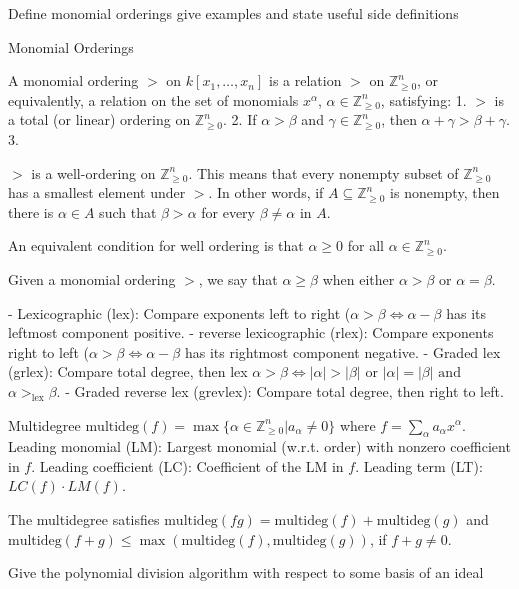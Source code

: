 
Define monomial orderings give examples and state useful side definitions 

Monomial Orderings

A monomial ordering \(>\) on \(k[x_1, \ldots, x_n]\) is a relation \(>\) on \(\mathbb{Z}_{\geq 0}^n\), or equivalently, 
a relation on the set of monomials \(x^{\alpha}\), \(\alpha \in \mathbb{Z}_{\geq 0}^n\), satisfying:
1. \(>\) is a total (or linear) ordering on \(\mathbb{Z}_{\geq 0}^n\).
2. If \(\alpha > \beta\) and \(\gamma \in \mathbb{Z}_{\geq 0}^n\), then \(\alpha + \gamma > \beta + \gamma\).
3.  \item \(>\) is a well-ordering on \(\mathbb{Z}_{\geq 0}^n\). This means that every nonempty subset of \(\mathbb{Z}_{\geq 0}^n\) has a smallest element under \(>\). In other words, if \(A \subseteq \mathbb{Z}_{\geq 0}^n\) is nonempty, then there is \(\alpha \in A\) such that \(\beta > \alpha\) for every \(\beta \ne \alpha\) in \(A\).

An equivalent condition for well ordering is that \( \alpha \geq 0 \) for all \( \alpha \in \mathbb{Z}^n_{\geq 0} \).

Given a monomial ordering \(>\), we say that \(\alpha \geq \beta\) when either \(\alpha > \beta\) or \(\alpha = \beta\).

- Lexicographic (lex): Compare exponents left to right (\( \alpha > \beta \iff \alpha - \beta \) has its leftmost component positive.
- reverse lexicographic (rlex): Compare exponents right to left (\( \alpha > \beta \iff \alpha - \beta \) has its rightmost component negative.
- Graded lex (grlex): Compare total degree, then lex \( \alpha > \beta \iff |\alpha| > |\beta| \text{ or } |\alpha| = |\beta| \text{ and }\)
  \( \alpha >_{\text{lex}} \beta \).
- Graded reverse lex (grevlex): Compare total degree, then right to left.

Multidegree \( \text{multideg}(f) = \max \{ \alpha \in \mathbb{Z}^n_{\geq 0} | a_\alpha \neq 0 \} \) where \( f = \sum_\alpha a_{\alpha} x^\alpha \).
Leading monomial (LM): Largest monomial (w.r.t. order) with nonzero coefficient in \( f \).
Leading coefficient (LC): Coefficient of the LM in \( f \).
Leading term (LT): \( LC(f) \cdot LM(f) \).

The multidegree satisfies \( \text{multideg}(fg) = \text{multideg}(f) + \text{multideg}(g) \)
and \( \text{multideg}(f + g) \leq \max(\text{multideg}(f),\text{multideg}(g)) \), if \( f + g \neq 0 \).


Give the polynomial division algorithm with respect to some basis of an ideal



